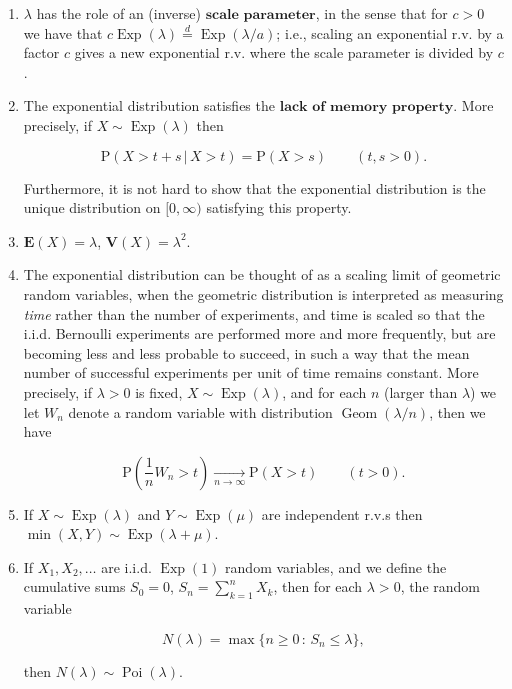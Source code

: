 \documentclass[11pt]{report}
\theoremstyle{plain}
\theoremstyle{definition}
\begin{document}
\begin{enumerate}[label=\arabic*.]
\item $\lambda$ has the role of an (inverse)
$\textbf{scale parameter}$, in the sense that for
$c>0$ we have that
$c \operatorname{Exp}(\lambda) \stackrel{d}{=}
\operatorname{Exp}(\lambda / a)$;
i.e., scaling an exponential r.v. by a factor $c$
gives a new exponential r.v. where the scale parameter
is divided by $c$.

\item The exponential distribution satisfies the
$\textbf{lack of memory property}$. More precisely,
if $X\sim \operatorname{Exp}(\lambda)$ then

\[
\mathrm{P}(X > t+s \,|\, X>t) = \mathrm{P}(X>s) \qquad (t,s>0).
\]

Furthermore, it is not hard to show that the
exponential distribution is the unique distribution on
$[0,\infty)$ satisfying this property.

\item $\mathbf{E}(X) = \lambda$,
$\mathbf{V}(X) = \lambda^2$.

\item The exponential distribution can be thought of as a
scaling limit of geometric random variables, when the
geometric distribution is interpreted as measuring
\emph{time} rather than the number of experiments, and time
is scaled so that the i.i.d. Bernoulli experiments are
performed more and more frequently, but are becoming
less and less probable to succeed, in such a way that
the mean number of successful experiments per unit of
time remains constant. More precisely, if $\lambda>0$
is fixed, $X\sim \operatorname{Exp}(\lambda)$, and
for each $n$ (larger than $\lambda$) we let $W_n$
denote a random variable with distribution
$\operatorname{Geom}(\lambda/n)$, then we have

\[
\mathrm{P}\left(\frac{1}{n} W_n > t\right)  \xrightarrow[n\to\infty]{} \mathrm{P}(X > t) \qquad (t>0).
\]

\item If $X\sim \operatorname{Exp}(\lambda)$ and
$Y \sim \operatorname{Exp}(\mu)$ are independent
r.v.s then
$\min(X,Y) \sim \operatorname{Exp}(\lambda+\mu)$.

\item If $X_1,X_2,\ldots$ are i.i.d. $\operatorname{Exp}(1)$
random variables, and we define the cumulative sums
$S_0=0$, $S_n = \sum_{k=1}^n X_k$, then for each
$\lambda>0$, the random variable

\[
N(\lambda) = \max\{ n\ge 0\,:\, S_n \le \lambda \},
\]

then $N(\lambda) \sim \operatorname{Poi}(\lambda)$.
\end{enumerate}
\end{document}
